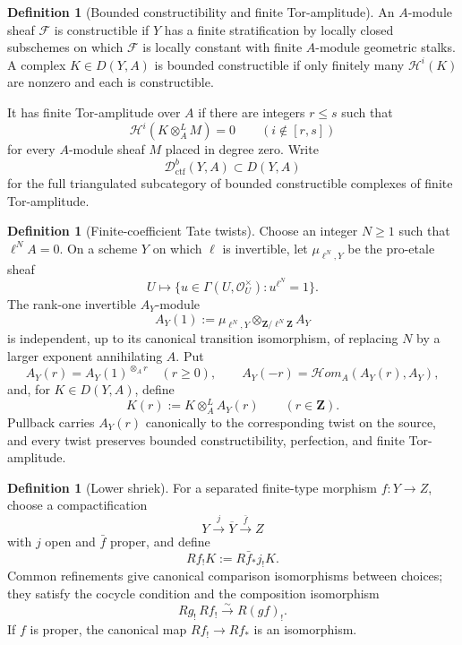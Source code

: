 \documentclass[10pt]{article}
\theoremstyle{definition}
\newtheorem{definition}[theorem]{Definition}
\newcommand{\Dctf}{\mathcal D^b_{\mathrm{ctf}}}
\begin{document}
\begin{definition}[Bounded constructibility and finite Tor-amplitude]
An \(A\)-module sheaf \(\mathcal F\) is constructible if \(Y\) has a finite
stratification by locally closed subschemes on which \(\mathcal F\) is
locally constant with finite \(A\)-module geometric stalks.  A complex
\(K\in D(Y,A)\) is bounded constructible if only finitely many
\(\mathcal H^i(K)\) are nonzero and each is constructible.

It has finite Tor-amplitude over \(A\) if there are integers \(r\leq s\)
such that
\[
 \mathcal H^i(K\otimes_A^L M)=0\qquad(i\notin[r,s])
\]
for every \(A\)-module sheaf \(M\) placed in degree zero.  Write
\[
 \Dctf(Y,A)\subset D(Y,A)
\]
for the full triangulated subcategory of bounded constructible complexes of
finite Tor-amplitude.
\end{definition}

\begin{definition}[Finite-coefficient Tate twists]
Choose an integer \(N\geq1\) such that \(\ell^NA=0\).  On a scheme
\(Y\) on which \(\ell\) is invertible, let \(\mu_{\ell^N,Y}\) be the
pro-etale sheaf
\[
 U\longmapsto
 \{u\in\Gamma(U,\mathcal O_U^\times):u^{\ell^N}=1\}.
\]
The rank-one invertible \(A_Y\)-module
\[
 A_Y(1):=
 \mu_{\ell^N,Y}\otimes_{\mathbf Z/\ell^N\mathbf Z}A_Y
\]
is independent, up to its canonical transition isomorphism, of replacing
\(N\) by a larger exponent annihilating \(A\).  Put
\[
 A_Y(r)=A_Y(1)^{\otimes_A r}\quad(r\geq0),
 \qquad
 A_Y(-r)=\mathcal Hom_A(A_Y(r),A_Y),
\]
and, for \(K\in D(Y,A)\), define
\[
 K(r):=K\otimes_A^LA_Y(r)\qquad(r\in\mathbf Z).
\]
Pullback carries \(A_Y(r)\) canonically to the corresponding twist on the
source, and every twist preserves bounded constructibility, perfection, and
finite Tor-amplitude.
\end{definition}

\begin{definition}[Lower shriek]
For a separated finite-type morphism \(f:Y\to Z\), choose a compactification
\[
 Y\xrightarrow{j}\overline Y\xrightarrow{\bar f}Z
\]
with \(j\) open and \(\bar f\) proper, and define
\[
 Rf_!K:=R\bar f_*j_!K.
\]
Common refinements give canonical comparison isomorphisms between choices;
they satisfy the cocycle condition and the composition isomorphism
\[
 Rg_!\,Rf_!\xrightarrow{\sim}R(gf)_!.
\]
If \(f\) is proper, the canonical map \(Rf_!\to Rf_*\) is an isomorphism.
\end{definition}
\end{document}
